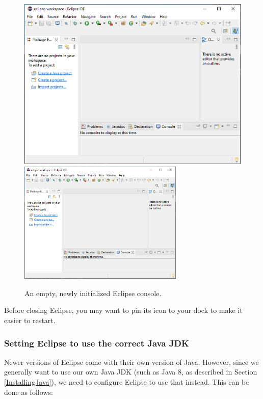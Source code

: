 \begin{figure}[ht]
\begin{center}
\iflatexml
   \includegraphics[]{images/EmptyEclipse}
\else
   \includegraphics[width=0.7\textwidth]{images/EmptyEclipse}
\fi
\end{center}
\caption{An empty, newly initialized Eclipse console.}
\label{EmptyEclipse:fig}
\end{figure}

\ifMacOS
\begin{sideblock}
Before closing Eclipse, you may want to pin its icon to your dock
to make it easier to restart.
\end{sideblock}
\fi

\subsubsection{Setting Eclipse to use the correct Java JDK}
\label{EclipseJDK:sec}

Newer versions of Eclipse come with their own version of
Java. However, since we generally want to use our own Java JDK (such
as Java 8, as described in Section \ref{InstallingJava}), we need to
configure Eclipse to use that instead. This can be done as follows:

